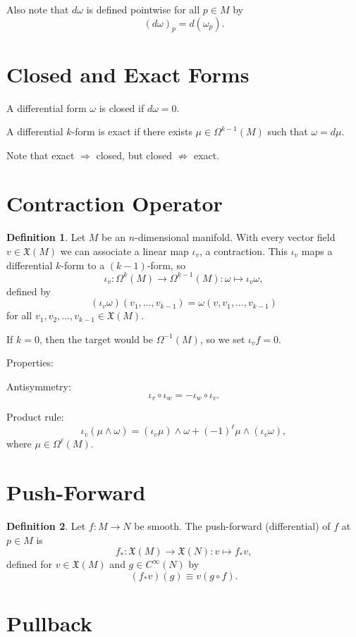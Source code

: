 \documentclass[11pt]{report}
\theoremstyle{definition}
\newtheorem{definition}{Definition}[chapter]
\theoremstyle{plain}
\theoremstyle{remark}
\begin{document}
Also note that $d\omega$ is defined pointwise for all $p\in M$ by
\[
(d\omega)_p = d(\omega_p).
\]

\section{Closed and Exact Forms}

A differential form $\omega$ is closed if $d\omega=0$.

A differential $k$-form is exact if there exists $\mu\in\Omega^{k-1}(M)$ such that $\omega=d\mu$.

Note that exact $\Rightarrow$ closed, but closed $\nRightarrow$ exact.

\section{Contraction Operator}

\begin{definition}
Let $M$ be an $n$-dimensional manifold. With every vector field $v\in\mathfrak X(M)$ we can associate a linear map $\iota_v$, a contraction. This $\iota_v$ maps a differential $k$-form to a $(k-1)$-form, so
\[
\iota_v:\Omega^k(M)\to\Omega^{k-1}(M):\omega\mapsto \iota_v\omega,
\]
defined by
\[
(\iota_v\omega)(v_1,\dots,v_{k-1}) = \omega(v,v_1,\dots,v_{k-1})
\]
for all $v_1,v_2,\dots,v_{k-1}\in\mathfrak X(M)$.
\end{definition}

If $k=0$, then the target would be $\Omega^{-1}(M)$, so we set $\iota_vf=0$.

Properties:

Antisymmetry:
\[
\iota_v\circ \iota_w = - \iota_w\circ \iota_v.
\]

Product rule:
\[
\iota_v(\mu\wedge\omega)=(\iota_v\mu)\wedge\omega + (-1)^\ell\mu\wedge(\iota_v\omega),
\]
where $\mu\in\Omega^\ell(M)$.

\section{Push-Forward}

\begin{definition}
Let $f:M\to N$ be smooth. The push-forward (differential) of $f$ at $p\in M$ is
\[
f_*: \mathfrak X(M)\to \mathfrak X(N): v \mapsto f_*v,
\]
defined for $v\in \mathfrak X(M)$ and $g\in C^\infty(N)$ by
\[
(f_{*}v)(g)\equiv v(g\circ f).
\]
\end{definition}

\section{Pullback}
\end{document}
